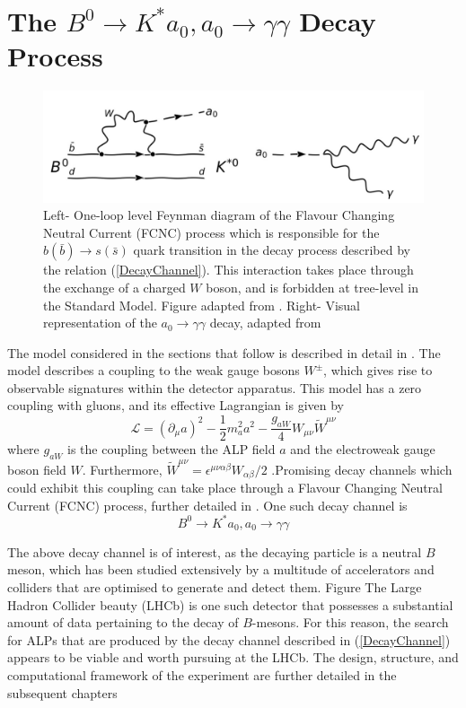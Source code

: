 \section{The $B^{0}\rightarrow K^{*}a_{0}, a_{0}\rightarrow\gamma\gamma$ Decay Process}\label{DecayProcess}
\begin{figure}[H]
    \centering
    \includegraphics[scale=0.5]{FCNCALP.jpg}
    \caption{Left- One-loop level Feynman diagram of the Flavour Changing Neutral Current (FCNC) process which is responsible for the $b(\bar{b})\rightarrow s(\bar{s})$ quark transition in the decay process described by the relation (\ref{DecayChannel}). This interaction takes place through the exchange of a charged $W$ boson, and is forbidden at tree-level in the Standard Model. Figure adapted from \cite{Izaguirre2016ANF}. Right- Visual representation of the $a_{0}\rightarrow\gamma\gamma$ decay, adapted from \cite{Michael:920}}
\end{figure}
The model considered in the sections that follow is described in detail in \cite{Izaguirre2016ANF}. The model describes a
coupling to the weak gauge bosons $W^{\pm}$, which gives rise to observable signatures within the detector apparatus. This model has a
zero coupling with gluons, and its effective Lagrangian is given by
\begin{equation}
    \mathcal{L} = (\partial_{\mu}a)^{2}-\frac{1}{2}m_{a}^{2}a^{2}-\frac{g_{aW}}{4}W_{\mu\nu}\tilde{W}^{\mu\nu}
\end{equation}
where $g_{aW}$ is the coupling between the ALP field $a$ and the electroweak gauge boson field $W$. Furthermore, $\tilde{W}^{\mu\nu} = \epsilon^{\mu\nu\alpha\beta}W_{\alpha\beta}/2$ \cite{Izaguirre2016ANF}.Promising decay channels which could exhibit this coupling can take
place through a Flavour Changing Neutral Current (FCNC) process, further detailed in \cite{Archilli:2017xmu}. One such decay channel is 
\begin{equation}\label{DecayChannel}
    B^{0}\rightarrow K^{*}a_{0}, a_{0}\rightarrow\gamma\gamma
\end{equation}

The above decay channel is of interest, as the decaying particle is a neutral $B$ meson, which has been studied extensively by a multitude of accelerators and colliders that are optimised to generate and detect
them. Figure  The Large Hadron Collider beauty (LHCb) is one such detector that possesses a substantial amount of data pertaining to the decay of $B$-mesons. For this reason, the search for ALPs that are produced by the decay channel
described in (\ref{DecayChannel}) appears to be viable and worth pursuing at the LHCb. The design, structure, and computational framework of the experiment are further detailed in the subsequent chapters




